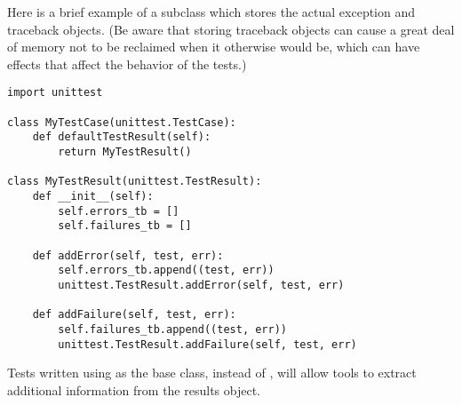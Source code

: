 Here is a brief example of a  subclass which stores
the actual exception and traceback objects.  (Be aware that storing
traceback objects can cause a great deal of memory not to be reclaimed
when it otherwise would be, which can have effects that affect the
behavior of the tests.)

\begin{verbatim}
import unittest

class MyTestCase(unittest.TestCase):
    def defaultTestResult(self):
        return MyTestResult()

class MyTestResult(unittest.TestResult):
    def __init__(self):
        self.errors_tb = []
        self.failures_tb = []

    def addError(self, test, err):
        self.errors_tb.append((test, err))
        unittest.TestResult.addError(self, test, err)

    def addFailure(self, test, err):
        self.failures_tb.append((test, err))
        unittest.TestResult.addFailure(self, test, err)
\end{verbatim}

Tests written using  as the base class, instead of
, will allow tools to extract additional information
from the results object.
